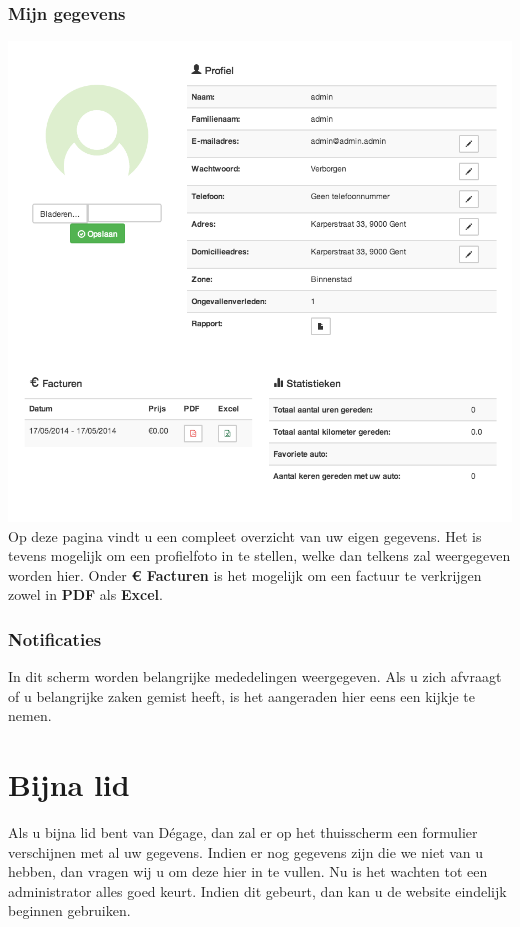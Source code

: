 \documentclass[11pt,a4paper,oneside]{article}
\begin{document}
\subsubsection{Mijn gegevens}
\label{mijngegevens}
\includegraphics[scale=0.9]{mijngegevens} \\
Op deze pagina vindt u een compleet overzicht van uw eigen gegevens. Het is tevens mogelijk om een profielfoto in te stellen, welke dan telkens zal weergegeven worden hier. Onder \textbf{\euro{} Facturen} is het mogelijk om een factuur te verkrijgen zowel in \textbf{PDF} als \textbf{Excel}.
\subsubsection{Notificaties}
\label{notificaties}
In dit scherm worden belangrijke mededelingen weergegeven. Als u zich afvraagt of u belangrijke zaken gemist heeft, is het aangeraden hier eens een kijkje te nemen.







\section{Bijna lid}
Als u bijna lid bent van D\'egage, dan zal er op het thuisscherm een formulier verschijnen met al uw gegevens. Indien er nog gegevens zijn die we niet van u hebben, dan vragen wij u om deze hier in te vullen. Nu is het wachten tot een administrator alles goed keurt. Indien dit gebeurt, dan kan u de website eindelijk beginnen gebruiken.
\end{document}
